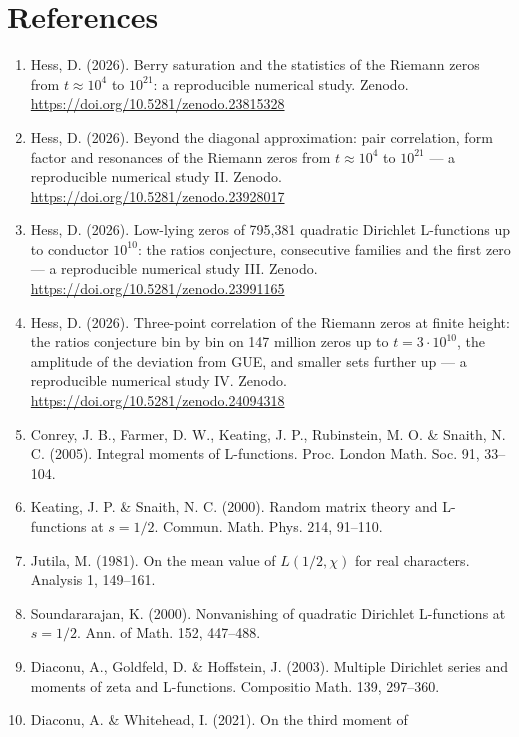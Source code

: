 \documentclass[
  10pt,
]{article}
\providecommand{\tightlist}{%
  \setlength{\itemsep}{0pt}\setlength{\parskip}{0pt}}
\begin{document}
\hypertarget{references}{%
\section{References}\label{references}}
\small

\begin{enumerate}
\def\labelenumi{\arabic{enumi}.}
\tightlist
\item
  Hess, D. (2026). Berry saturation and the statistics of the Riemann
  zeros from \(t \approx 10^4\) to \(10^{21}\): a reproducible numerical
  study. Zenodo. \url{https://doi.org/10.5281/zenodo.23815328}
\item
  Hess, D. (2026). Beyond the diagonal approximation: pair correlation,
  form factor and resonances of the Riemann zeros from
  \(t \approx 10^4\) to \(10^{21}\) --- a reproducible numerical study
  II. Zenodo. \url{https://doi.org/10.5281/zenodo.23928017}
\item
  Hess, D. (2026). Low-lying zeros of 795,381 quadratic Dirichlet
  L-functions up to conductor \(10^{10}\): the ratios conjecture,
  consecutive families and the first zero --- a reproducible numerical
  study III. Zenodo. \url{https://doi.org/10.5281/zenodo.23991165}
\item
  Hess, D. (2026). Three-point correlation of the Riemann zeros at
  finite height: the ratios conjecture bin by bin on 147 million zeros
  up to \(t = 3\cdot10^{10}\), the amplitude of the deviation from GUE,
  and smaller sets further up --- a reproducible numerical study IV.
  Zenodo. \url{https://doi.org/10.5281/zenodo.24094318}
\item
  Conrey, J. B., Farmer, D. W., Keating, J. P., Rubinstein, M. O. \&
  Snaith, N. C. (2005). Integral moments of L-functions. Proc. London
  Math. Soc. 91, 33--104.
\item
  Keating, J. P. \& Snaith, N. C. (2000). Random matrix theory and
  L-functions at \(s = 1/2\). Commun. Math. Phys. 214, 91--110.
\item
  Jutila, M. (1981). On the mean value of \(L(1/2, \chi)\) for real
  characters. Analysis 1, 149--161.
\item
  Soundararajan, K. (2000). Nonvanishing of quadratic Dirichlet
  L-functions at \(s = 1/2\). Ann. of Math. 152, 447--488.
\item
  Diaconu, A., Goldfeld, D. \& Hoffstein, J. (2003). Multiple Dirichlet
  series and moments of zeta and L-functions. Compositio Math. 139,
  297--360.
\item
  Diaconu, A. \& Whitehead, I. (2021). On the third moment of

\end{enumerate}
\end{document}

